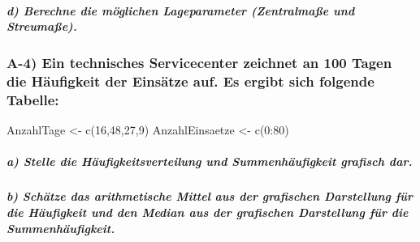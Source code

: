 \documentclass[
]{article}
\newenvironment{Shaded}{\begin{snugshade}}{\end{snugshade}}
\newcommand{\DecValTok}[1]{\textcolor[rgb]{0.00,0.00,0.81}{#1}}
\newcommand{\FunctionTok}[1]{\textcolor[rgb]{0.00,0.00,0.00}{#1}}
\newcommand{\NormalTok}[1]{#1}
\newcommand{\OtherTok}[1]{\textcolor[rgb]{0.56,0.35,0.01}{#1}}
\newcommand{\SpecialCharTok}[1]{\textcolor[rgb]{0.00,0.00,0.00}{#1}}
\begin{document}
\hypertarget{d-berechne-die-muxf6glichen-lageparameter-zentralmauxdfe-und-streumauxdfe.}{%
\subparagraph{\texorpdfstring{\textbf{d) Berechne die möglichen
Lageparameter (Zentralmaße und
Streumaße).}}{d) Berechne die möglichen Lageparameter (Zentralmaße und Streumaße).}}\label{d-berechne-die-muxf6glichen-lageparameter-zentralmauxdfe-und-streumauxdfe.}}

\hypertarget{a-4-ein-technisches-servicecenter-zeichnet-an-100-tagen-die-huxe4ufigkeit-der-einsuxe4tze-auf.-es-ergibt-sich-folgende-tabelle}{%
\subsubsection{A-4) Ein technisches Servicecenter zeichnet an 100 Tagen
die Häufigkeit der Einsätze auf. Es ergibt sich folgende
Tabelle:}\label{a-4-ein-technisches-servicecenter-zeichnet-an-100-tagen-die-huxe4ufigkeit-der-einsuxe4tze-auf.-es-ergibt-sich-folgende-tabelle}}

\begin{Shaded}
\begin{Highlighting}[]
\NormalTok{AnzahlTage }\OtherTok{\textless{}{-}} \FunctionTok{c}\NormalTok{(}\DecValTok{16}\NormalTok{,}\DecValTok{48}\NormalTok{,}\DecValTok{27}\NormalTok{,}\DecValTok{9}\NormalTok{)}
\NormalTok{AnzahlEinsaetze }\OtherTok{\textless{}{-}} \FunctionTok{c}\NormalTok{(}\DecValTok{0}\SpecialCharTok{:}\DecValTok{80}\NormalTok{)}
\end{Highlighting}
\end{Shaded}

\hypertarget{a-stelle-die-huxe4ufigkeitsverteilung-und-summenhuxe4ufigkeit-grafisch-dar.-1}{%
\subparagraph{\texorpdfstring{\textbf{a) Stelle die
Häufigkeitsverteilung und Summenhäufigkeit grafisch
dar.}}{a) Stelle die Häufigkeitsverteilung und Summenhäufigkeit grafisch dar.}}\label{a-stelle-die-huxe4ufigkeitsverteilung-und-summenhuxe4ufigkeit-grafisch-dar.-1}}

\hypertarget{b-schuxe4tze-das-arithmetische-mittel-aus-der-grafischen-darstellung-fuxfcr-die-huxe4ufigkeit-und-den-median-aus-der-grafischen-darstellung-fuxfcr-die-summenhuxe4ufigkeit.-1}{%
\subparagraph{\texorpdfstring{\textbf{b) Schätze das arithmetische
Mittel aus der grafischen Darstellung für die Häufigkeit und den Median
aus der grafischen Darstellung für die
Summenhäufigkeit.}}{b) Schätze das arithmetische Mittel aus der grafischen Darstellung für die Häufigkeit und den Median aus der grafischen Darstellung für die Summenhäufigkeit.}}\label{b-schuxe4tze-das-arithmetische-mittel-aus-der-grafischen-darstellung-fuxfcr-die-huxe4ufigkeit-und-den-median-aus-der-grafischen-darstellung-fuxfcr-die-summenhuxe4ufigkeit.-1}}
\end{document}
